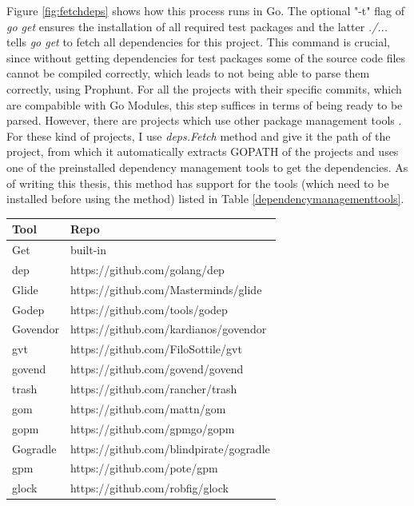 \documentclass{seal_thesis}
\begin{document}
\noindent Figure \ref{fig:fetchdeps} shows how this process runs in Go. The optional "-t" flag of \textit{go get} ensures the installation of all required test packages and the latter \textit{./...} tells \textit{go get} to fetch all dependencies for this project. This command is crucial, since without getting dependencies for test packages some of the source code files cannot be compiled correctly, which leads to not being able to parse them correctly, using Prophunt. For all the projects with their specific commits, which are compabible with Go Modules, this step suffices in terms of being ready to be parsed. However, there are projects which use other package management tools \cite{packagemanagement}. For these kind of projects, I use \textit{deps.Fetch} method and give it the path of the project, from which it automatically extracts GOPATH of the projects and uses one of the preinstalled dependency management tools to get the dependencies. As of writing this thesis, this method has support for the tools (which need to be installed before using the method) listed in Table \ref{dependencymanagementtools}.

\begin{table}[H]
\caption{List of dependency management tools supported in GoABS \cite{sealuzh/goabs}}
\label{dependencymanagementtools}
\begin{longtable}[c]{@{}ll@{}}
	\toprule
	Tool & Repo \\* \midrule
	\endfirsthead
	\endhead
	\bottomrule
	\endfoot
	\endlastfoot
	Get & built-in \\
	dep & https://github.com/golang/dep \\
	Glide & https://github.com/Masterminds/glide \\
	Godep & https://github.com/tools/godep \\
	Govendor & https://github.com/kardianos/govendor \\
	gvt & https://github.com/FiloSottile/gvt \\
	govend & https://github.com/govend/govend \\
	trash & https://github.com/rancher/trash \\
	gom & https://github.com/mattn/gom \\
	gopm & https://github.com/gpmgo/gopm \\
	Gogradle & https://github.com/blindpirate/gogradle \\
	gpm & https://github.com/pote/gpm \\
	glock & https://github.com/robfig/glock \\* \bottomrule
\end{longtable}
\end{table}
\end{document}
